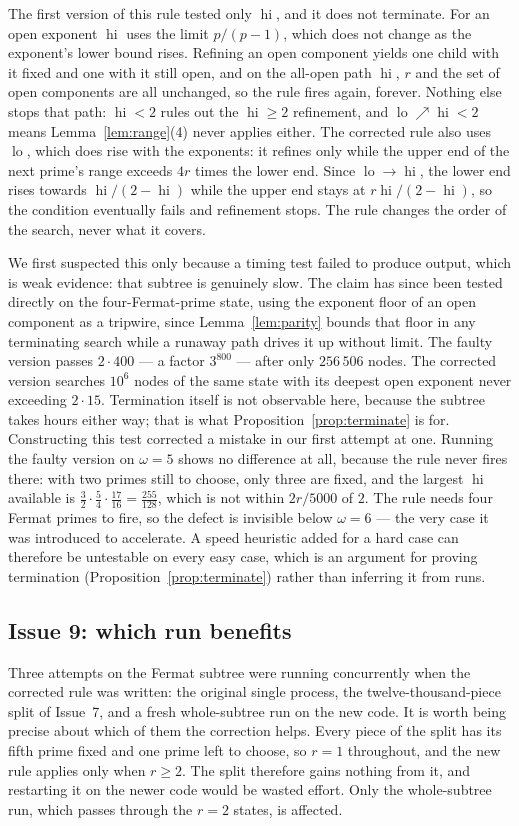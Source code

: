 \documentclass[11pt]{amsart}
\theoremstyle{remark}
\DeclareMathOperator{\lo}{lo}
\DeclareMathOperator{\hi}{hi}
\begin{document}
The first version of this rule tested only $\hi$, and it does not terminate. For
an open exponent $\hi$ uses the limit $p/(p-1)$, which does not change as the
exponent's lower bound rises. Refining an open component yields one child with it
fixed and one with it still open, and on the all-open path $\hi$, $r$ and the set
of open components are all unchanged, so the rule fires again, forever. Nothing
else stops that path: $\hi < 2$ rules out the $\hi \ge 2$ refinement, and
$\lo \nearrow \hi < 2$ means Lemma~\ref{lem:range}(4) never applies either. The
corrected rule also uses $\lo$, which does rise with the exponents: it refines
only while the upper end of the next prime's range exceeds $4r$ times the lower
end. Since $\lo \to \hi$, the lower end rises towards $\hi/(2-\hi)$ while the
upper end stays at $r\hi/(2-\hi)$, so the condition eventually fails and
refinement stops. The rule changes the order of the search, never what it covers.

We first suspected this only because a timing test failed to produce output, which
is weak evidence: that subtree is genuinely slow. The claim has since been tested
directly on the four-Fermat-prime state, using the exponent floor of an open
component as a tripwire, since Lemma~\ref{lem:parity} bounds that floor in any
terminating search while a runaway path drives it up without limit. The faulty
version passes $2 \cdot 400$ --- a factor $3^{800}$ --- after only $256\,506$
nodes. The corrected version searches $10^{6}$ nodes of the same state with its
deepest open exponent never exceeding $2 \cdot 15$. Termination itself is not
observable here, because the subtree takes hours either way; that is what
Proposition~\ref{prop:terminate} is for. Constructing this test corrected a
mistake in our first attempt at one. Running the faulty version on $\omega = 5$ shows no
difference at all, because the rule never fires there: with two primes still to
choose, only three are fixed, and the largest $\hi$ available is
$\tfrac32\cdot\tfrac54\cdot\tfrac{17}{16} = \tfrac{255}{128}$, which is not
within $2r/5000$ of $2$. The rule needs four Fermat primes to fire, so the defect
is invisible below $\omega = 6$ --- the very case it was introduced to
accelerate. A speed heuristic added for a hard case can therefore be untestable
on every easy case, which is an argument for proving termination
(Proposition~\ref{prop:terminate}) rather than inferring it from runs.

\subsection{Issue 9: which run benefits}
Three attempts on the Fermat subtree were running concurrently when the corrected
rule was written: the original single process, the twelve-thousand-piece split of
Issue~7, and a fresh whole-subtree run on the new code. It is worth being precise
about which of them the correction helps. Every piece of the split has its fifth
prime fixed and one prime left to choose, so $r = 1$ throughout, and the new rule
applies only when $r \ge 2$. The split therefore gains nothing from it, and
restarting it on the newer code would be wasted effort. Only the whole-subtree
run, which passes through the $r = 2$ states, is affected.
\end{document}
